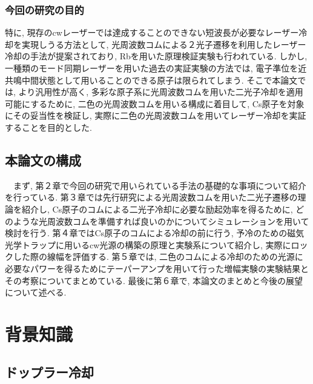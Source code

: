\documentclass[uplatex, dvipdfmx, a4paper, report, papersize, 11pt]{jsbook}
\begin{document}
\subsection{今回の研究の目的}
特に, 現存のcwレーザーでは達成することのできない短波長が必要なレーザー冷却を実現しうる方法として, 光周波数コムによる２光子遷移を利用したレーザー冷却の手法が提案されており, Rbを用いた原理検証実験も行われている\cite{PhysRevA.73.063407, PhysRevX.6.041004}. しかし, 一種類のモード同期レーザーを用いた過去の実証実験の方法では, 電子準位を近共鳴中間状態として用いることのできる原子は限られてしまう. そこで本論文では, より汎用性が高く, 多彩な原子系に光周波数コムを用いた二光子冷却を適用可能にするために, 二色の光周波数コムを用いる構成に着目して, Cs原子を対象にその妥当性を検証し, 実際に二色の光周波数コムを用いてレーザー冷却を実証することを目的とした. \\

\section{本論文の構成}
　まず, 第２章で今回の研究で用いられている手法の基礎的な事項について紹介を行っている. 第３章では先行研究による光周波数コムを用いた二光子遷移の理論を紹介し, Cs原子のコムによる二光子冷却に必要な励起効率を得るために, どのような光周波数コムを準備すれば良いのかについてシミュレーションを用いて検討を行う. 第４章ではCs原子のコムによる冷却の前に行う, 予冷のための磁気光学トラップに用いるcw光源の構築の原理と実験系について紹介し, 実際にロックした際の線幅を評価する. 第５章では, 二色のコムによる冷却のための光源に必要なパワーを得るためにテーパーアンプを用いて行った増幅実験の実験結果とその考察についてまとめている. 最後に第６章で, 本論文のまとめと今後の展望について述べる.
\newpage

\chapter{背景知識}

\section{ドップラー冷却}
\end{document}

